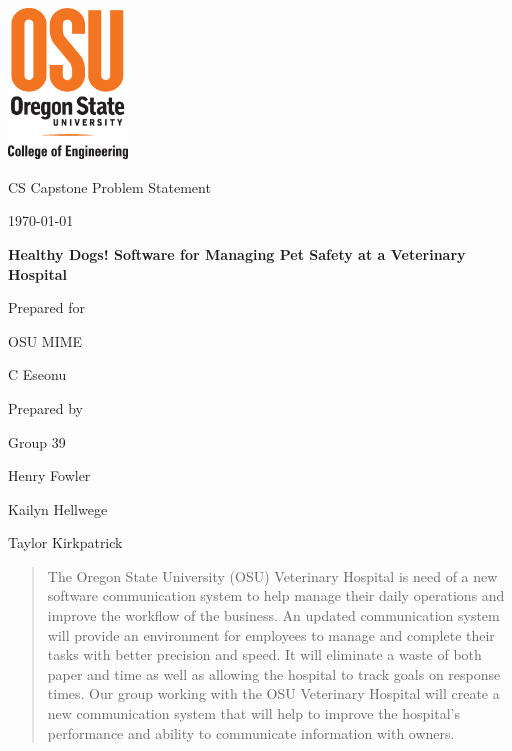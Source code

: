 \documentclass[onecolumn, draftclsnofoot,10pt, compsoc]{IEEEtran}
\def \CapstoneTeamName{		Group 39}
\def \CapstoneTeamNumber{		39}
\def \GroupMemberOne{			Henry Fowler}
\def \GroupMemberTwo{			Kailyn Hellwege}
\def \GroupMemberThree{			Taylor Kirkpatrick}
\def \CapstoneProjectName{		Healthy Dogs! Software for Managing Pet Safety at a Veterinary Hospital}
\def \CapstoneSponsorCompany{	OSU MIME}
\def \CapstoneSponsorPerson{		C Eseonu}
\def \DocType{		Problem Statement
				}
\newcommand{\NameSigPair}[1]{\par
\makebox[2.75in][r]{#1} \hfil 	\makebox[3.25in]{\makebox[2.25in]{\hrulefill} \hfill		\makebox[.75in]{\hrulefill}}
\par\vspace{-12pt} \textit{\tiny\noindent
\makebox[2.75in]{} \hfil		\makebox[3.25in]{\makebox[2.25in][r]{Signature} \hfill	\makebox[.75in][r]{Date}}}}
\renewcommand{\NameSigPair}[1]{#1}
\begin{document}
\begin{titlepage}
    \begin{singlespace}
    	\includegraphics[height=4cm]{coe_v_spot1}
        \hfill 
        \par\vspace{.2in}
        \centering
        \scshape{
            \huge CS Capstone \DocType \par
            {\large\today}\par
            \vspace{.5in}
            \textbf{\Huge\CapstoneProjectName}\par
            \vfill
            {\large Prepared for}\par
            \Huge \CapstoneSponsorCompany\par
            \vspace{5pt}
            {\Large\NameSigPair{\CapstoneSponsorPerson}\par}
            {\large Prepared by }\par
            Group\CapstoneTeamNumber\par
            \vspace{5pt}
            {\Large
                \NameSigPair{\GroupMemberOne}\par
                \NameSigPair{\GroupMemberTwo}\par
                \NameSigPair{\GroupMemberThree}\par
            }
            \vspace{20pt}
        }
        \begin{abstract}
        	The Oregon State University (OSU) Veterinary Hospital is need of a new software communication system to help manage their daily operations and improve the workflow of the business. An updated communication system will provide an environment for employees to manage and complete their tasks with better precision and speed. It will eliminate a waste of both paper and time as well as allowing the hospital to track goals on response times. Our group working with the OSU Veterinary Hospital will create a new communication system that will help to improve the hospital’s performance and ability to communicate information with owners.
        \end{abstract}     
    \end{singlespace}
\end{titlepage}
\end{document}

